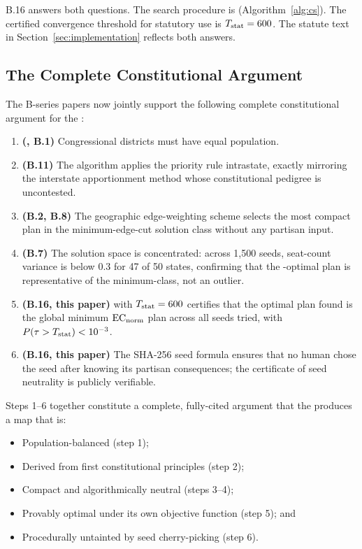 B.16 answers both questions.
The search procedure is \cs{} (Algorithm~\ref{alg:cs}).
The certified convergence threshold for statutory use is $T_{\mathrm{stat}} = 600$.
The \dia{} statute text in Section~\ref{sec:implementation} reflects both
answers.

\subsection{The Complete Constitutional Argument}

The B-series papers now jointly support the following complete constitutional
argument for the \dia{}:

\begin{enumerate}
\item \textbf{(\wesberry{}, B.1)} Congressional districts must have equal
      population.
\item \textbf{(B.11)} The \ar{} algorithm applies the \hh{} priority rule
      intrastate, exactly mirroring the interstate apportionment method whose
      constitutional pedigree is uncontested.
\item \textbf{(B.2, B.8)} The geographic edge-weighting scheme selects the
      most compact plan in the minimum-edge-cut solution class without any
      partisan input.
\item \textbf{(B.7)} The solution space is concentrated: across 1{,}500 seeds,
      seat-count variance is below 0.3 for 47 of 50 states, confirming that
      the \cs{}-optimal plan is representative of the minimum-class, not an
      outlier.
\item \textbf{(B.16, this paper)} \cs{} with $T_{\mathrm{stat}} = 600$ certifies that
      the optimal plan found is the global minimum $\mathrm{EC}_{\mathrm{norm}}$ plan across all
      seeds tried, with $P(\tau > T_{\mathrm{stat}}) < 10^{-3}$.
\item \textbf{(B.16, this paper)} The SHA-256 seed formula ensures that no
      human chose the seed after knowing its partisan consequences; the
      certificate of seed neutrality is publicly verifiable.
\end{enumerate}

Steps 1--6 together constitute a complete, fully-cited argument that the
\dia{} produces a map that is:
\begin{itemize}
\item Population-balanced (step 1);
\item Derived from first constitutional principles (step 2);
\item Compact and algorithmically neutral (steps 3--4);
\item Provably optimal under its own objective function (step 5); and
\item Procedurally untainted by seed cherry-picking (step 6).
\end{itemize}


